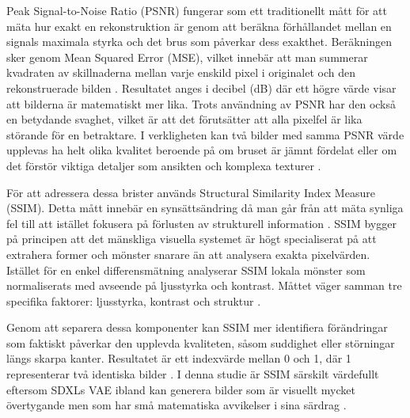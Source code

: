 Peak Signal-to-Noise Ratio (PSNR) fungerar som ett traditionellt mått för att mäta hur exakt en rekonstruktion är genom att beräkna förhållandet mellan en signals maximala styrka och det brus som påverkar dess exakthet. Beräkningen sker genom  Mean Squared Error (MSE), vilket innebär att man summerar kvadraten av skillnaderna mellan varje enskild pixel i originalet och den rekonstruerade bilden \cite{hore2010psnrssim}. Resultatet anges i decibel (dB) där ett högre värde visar att bilderna är matematiskt mer lika. Trots användning av PSNR har den också en betydande svaghet, vilket är att  det förutsätter att alla pixelfel är lika störande för en betraktare. I verkligheten kan två bilder med samma PSNR värde upplevas ha helt olika kvalitet beroende på om bruset är jämnt fördelat eller om det förstör viktiga detaljer som ansikten och komplexa texturer \cite{hore2010psnrssim}.

För att adressera dessa brister används Structural Similarity Index Measure (SSIM). Detta mått innebär en synsättsändring då man går från att mäta synliga fel till att istället fokusera på förlusten av strukturell information \cite{Wang2004SSIM}. SSIM bygger på principen att det mänskliga visuella systemet är högt specialiserat på att extrahera former och mönster snarare än att analysera exakta pixelvärden. Istället för en enkel differensmätning analyserar SSIM lokala mönster som normaliserats med avseende på ljusstyrka och kontrast. Måttet väger samman tre specifika faktorer: ljusstyrka, kontrast och struktur \cite{hore2010psnrssim}.

Genom att separera dessa komponenter kan SSIM mer identifiera förändringar som faktiskt påverkar den upplevda kvaliteten, såsom suddighet eller störningar längs skarpa kanter. Resultatet är ett indexvärde mellan 0 och 1, där 1 representerar två identiska bilder \cite{hore2010psnrssim}. I denna studie är SSIM särskilt värdefullt eftersom SDXLs VAE ibland kan generera bilder som är visuellt mycket övertygande men som har små matematiska avvikelser i sina särdrag \cite{podell2024sdxl}.



